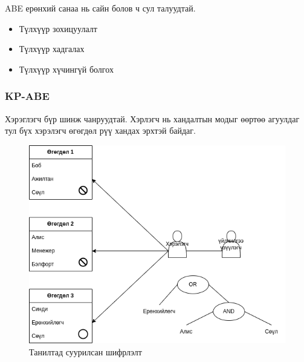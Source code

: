 ABE ерөнхий санаа нь сайн болов ч сул талуудтай.
\begin{itemize}
    \item Түлхүүр зохицуулалт
    \item Түлхүүр хадгалах
    \item Түлхүүр хүчингүй болгох
\end{itemize}

\subsubsection*{KP-ABE}
Хэрэглэгч бүр шинж чанруудтай. Хэрлэгч нь хандалтын модыг өөртөө агуулдаг тул бүх хэрэлэгч өгөгдөл рүү хандах эрхтэй байдаг.
\begin{figure}[ht]
    \centering
    \includegraphics[scale=0.6]{Figures/kp-abe.drawio.png}
    \caption[IBE]{Танилтад суурилсан шифрлэлт}
    \label{fig:kp-abe}
\end{figure}

